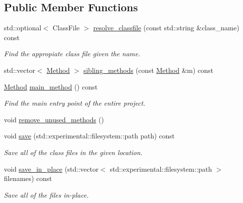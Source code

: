 \subsection*{Public Member Functions}
\begin{DoxyCompactItemize}
\item 
\mbox{\label{classProject_a2ec0981bc841bcbac0ca8072f3b960b5}} 
std\+::optional$<$ Class\+File $>$ \hyperlink{classProject_a2ec0981bc841bcbac0ca8072f3b960b5}{resolve\+\_\+classfile} (const std\+::string \&class\+\_\+name) const
\begin{DoxyCompactList}\small\item\em Find the appropiate class file given the name. \end{DoxyCompactList}\item 
std\+::vector$<$ \hyperlink{classMethod}{Method} $>$ \hyperlink{classProject_afee58125bfee1c7a1871be7805e855fa}{sibling\+\_\+methods} (const \hyperlink{classMethod}{Method} \&m) const
\item 
\mbox{\label{classProject_a8122de9e7b4bc2a63e1391727c881474}} 
\hyperlink{classMethod}{Method} \hyperlink{classProject_a8122de9e7b4bc2a63e1391727c881474}{main\+\_\+method} () const
\begin{DoxyCompactList}\small\item\em Find the main entry point of the entire project. \end{DoxyCompactList}\item 
void \hyperlink{classProject_af5f35c59d1175af1cfa659a597bb6353}{remove\+\_\+unused\+\_\+methods} ()
\item 
\mbox{\label{classProject_aff5e62e0e0e3e8c7123a7dd6ae51cb3f}} 
void \hyperlink{classProject_aff5e62e0e0e3e8c7123a7dd6ae51cb3f}{save} (std\+::experimental\+::filesystem\+::path path) const
\begin{DoxyCompactList}\small\item\em Save all of the class files in the given location. \end{DoxyCompactList}\item 
\mbox{\label{classProject_aecff214fd8b3fc5e855ec925ebe93f59}} 
void \hyperlink{classProject_aecff214fd8b3fc5e855ec925ebe93f59}{save\+\_\+in\+\_\+place} (std\+::vector$<$ std\+::experimental\+::filesystem\+::path $>$ filenames) const
\begin{DoxyCompactList}\small\item\em Save all of the files in-\/place. \end{DoxyCompactList}\item 

\end{DoxyCompactItemize}
